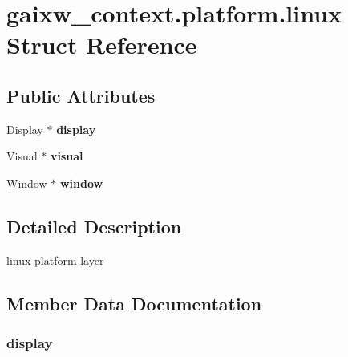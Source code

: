 \hypertarget{structgaixw__context_8platform_8linux}{}\section{gaixw\+\_\+context.\+platform.\+linux Struct Reference}
\label{structgaixw__context_8platform_8linux}
\subsection*{Public Attributes}
\begin{DoxyCompactItemize}
\item 
\mbox{\label{structgaixw__context_8platform_8linux_aebf78b512222fe4dcd14e7d5060a15b0}} 
Display $\ast$ {\bfseries display}
\item 
\mbox{\label{structgaixw__context_8platform_8linux_a1dfb6b98aef3416e03d50fd2fb525600}} 
Visual $\ast$ {\bfseries visual}
\item 
\mbox{\label{structgaixw__context_8platform_8linux_a05b8c74cbd96fbf2de4c1a352702fbf4}} 
Window $\ast$ {\bfseries window}
\end{DoxyCompactItemize}


\subsection{Detailed Description}
linux platform layer 

\subsection{Member Data Documentation}
\mbox{\label{structgaixw__context_8platform_8linux_aebf78b512222fe4dcd14e7d5060a15b0}} 
\subsubsection{\texorpdfstring{display}{display}}
{\footnotesize\ttfamily }

